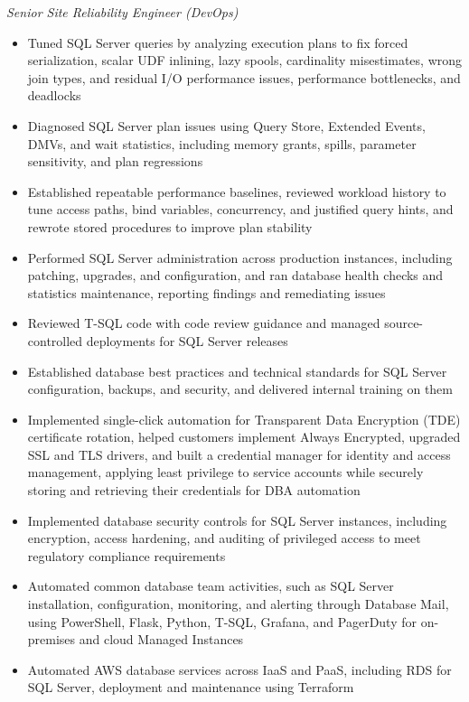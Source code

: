 \documentclass[10pt,a4paper]{article}
\begin{document}
\textit{Senior Site Reliability Engineer (DevOps)}\\[-5pt]
\begin{itemize}
  \item Tuned SQL Server queries by analyzing execution plans to fix forced serialization, scalar UDF inlining, lazy spools, cardinality misestimates, wrong join types, and residual I/O performance issues, performance bottlenecks, and deadlocks
  \item Diagnosed SQL Server plan issues using Query Store, Extended Events, DMVs, and wait statistics, including memory grants, spills, parameter sensitivity, and plan regressions
  \item Established repeatable performance baselines, reviewed workload history to tune access paths, bind variables, concurrency, and justified query hints, and rewrote stored procedures to improve plan stability
  \item Performed SQL Server administration across production instances, including patching, upgrades, and configuration, and ran database health checks and statistics maintenance, reporting findings and remediating issues
  \item Reviewed T-SQL code with code review guidance and managed source-controlled deployments for SQL Server releases
  \item Established database best practices and technical standards for SQL Server configuration, backups, and security, and delivered internal training on them
  \item Implemented single-click automation for Transparent Data Encryption (TDE) certificate rotation, helped customers implement Always Encrypted, upgraded SSL and TLS drivers, and built a credential manager for identity and access management, applying least privilege to service accounts while securely storing and retrieving their credentials for DBA automation
  \item Implemented database security controls for SQL Server instances, including encryption, access hardening, and auditing of privileged access to meet regulatory compliance requirements
  \item Automated common database team activities, such as SQL Server installation, configuration, monitoring, and alerting through Database Mail, using PowerShell, Flask, Python, T-SQL, Grafana, and PagerDuty for on-premises and cloud Managed Instances
  \item Automated AWS database services across IaaS and PaaS, including RDS for SQL Server, deployment and maintenance using Terraform

\end{itemize}
\end{document}
